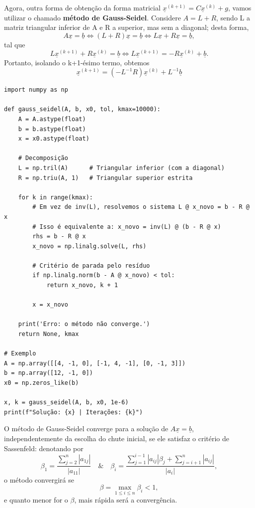 \documentclass[../numerical_methods.tex]{subfiles}
\begin{document}
Agora, outra forma de obtenção da forma matricial \(\underline{x}^{(k+1)} = C\underline{x}^{(k)} + g\), vamos utilizar o chamado \textbf{método de Gauss-Seidel}. Considere \(A = L + R\), sendo L a matriz triangular inferior de A e R a superior, mas sem a diagonal; desta forma,
\[
	A \underline{x}= \underline{b} \Longleftrightarrow (L+R)\underline{x} = \underline{b} \Longleftrightarrow L\underline{x}+R\underline{x} = \underline{b},
\]
tal que
\[
	L \underline{x}^{(k+1)}+R\underline{x}^{(k)} = \underline{b} \Longleftrightarrow L\underline{x}^{(k+1)} = - R\underline{x}^{(k)} + \underline{b}.
\]
Portanto, isolando o k+1-ésimo termo, obtemos
\[
	\boxed{\underline{x}^{(k+1)}=(-L^{-1}R)\underline{x}^{(k)}+L^{-1}\underline{b}}
\]
\begin{listing}[H]
	\caption{Método de Gauss-Seidel em Python}
	\begin{verbatim}
import numpy as np

def gauss_seidel(A, b, x0, tol, kmax=10000):
    A = A.astype(float)
    b = b.astype(float)
    x = x0.astype(float)

    # Decomposição
    L = np.tril(A)      # Triangular inferior (com a diagonal)
    R = np.triu(A, 1)   # Triangular superior estrita

    for k in range(kmax):
        # Em vez de inv(L), resolvemos o sistema L @ x_novo = b - R @ x
        # Isso é equivalente a: x_novo = inv(L) @ (b - R @ x)
        rhs = b - R @ x
        x_novo = np.linalg.solve(L, rhs)

        # Critério de parada pelo resíduo
        if np.linalg.norm(b - A @ x_novo) < tol:
            return x_novo, k + 1

        x = x_novo

    print('Erro: o método não converge.')
    return None, kmax

# Exemplo
A = np.array([[4, -1, 0], [-1, 4, -1], [0, -1, 3]])
b = np.array([12, -1, 0])
x0 = np.zeros_like(b)

x, k = gauss_seidel(A, b, x0, 1e-6)
print(f"Solução: {x} | Iterações: {k}")
\end{verbatim}
\end{listing}

O método de Gauss-Seidel converge para a solução de \(A \underline{x} = \underline{b}\), independentemente da escolha do chute inicial, se ele satisfaz o critério de Sassenfeld: denotando por
\[
	\beta_1 = \frac{\sum\limits_{j=2}^{n}| a_{1j} |}{| a_{11} |} \quad\&\quad \beta_{i} = \frac{\sum\limits_{j=1}^{i-1}| a_{ij} |\beta_{j} + \sum\limits_{j=i+1}^{n}|a_{ij} |}{| a_{i} |},
\]
o método convergirá se
\[
	\beta =\max\limits_{1\leq i\leq n}\beta_{i} < 1,
\]
e quanto menor for o \(\beta \), mais rápida será a convergência.
\end{document}

